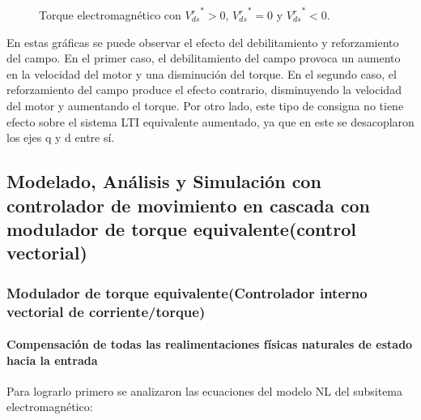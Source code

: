 \documentclass[a4paper, 10pt, onecolumn,journal]{ieeeconf}
\begin{document}
\begin{figure}[H]
	\centering
	\begin{adjustbox}{max width=\columnwidth}
	\end{adjustbox}
	\caption{Torque electromagnético con ${V^r_{ds}}^* > 0$, ${V^r_{ds}}^* = 0$ y ${V^r_{ds}}^* < 0$.}
	\label{Torque electromagnético con ${V^r_{ds}}^* > 0$, ${V^r_{ds}}^* = 0$ y ${V^r_{ds}}^* < 0$}
\end{figure}
En estas gráficas se puede observar el efecto del debilitamiento y reforzamiento del campo. En el primer caso, el debilitamiento del campo provoca un aumento en la velocidad del motor y una disminución del torque. En el segundo caso, el reforzamiento del campo produce el efecto contrario, disminuyendo la velocidad del motor y aumentando el torque. Por otro lado, este tipo de consigna no tiene efecto sobre el sistema LTI equivalente aumentado, ya que en este se desacoplaron los ejes q y d entre sí.
\subsection{\textbf{Modelado, Análisis y Simulación con controlador de movimiento en cascada con modulador de torque equivalente(control vectorial)}}


\subsubsection{\textbf{Modulador de torque equivalente(Controlador interno vectorial de corriente/torque)}}
\paragraph{\textbf{Compensación de todas las realimentaciones físicas naturales de estado hacia la entrada}}
Para lograrlo primero se analizaron las ecuaciones del modelo NL del subsitema electromagnético:
\end{document}
